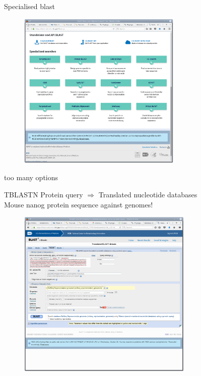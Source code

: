 \documentclass[pdf]{beamer}
\begin{document}
\begin{frame}{Specialised blast}
  \begin{figure}[ht]
    \includegraphics[width=0.7\textwidth]{images/ncbi_blast_2}
  \end{figure} 
  too many options
\end{frame}

\begin{frame}{TBLASTN}
\footnotesize  Protein query $\Rightarrow$ Translated nucleotide databases\\
Mouse nanog protein sequence against genomes!
  \begin{figure}[ht]
    \includegraphics[width=0.75\textwidth]{images/ncbi_blast_3}
  \end{figure} 
\end{frame}
\end{document}
